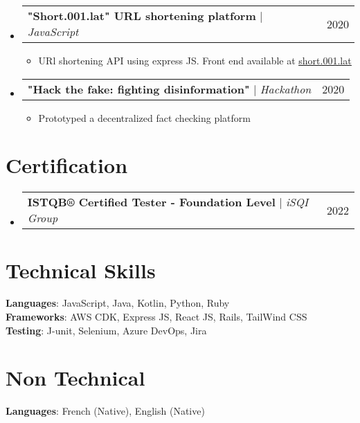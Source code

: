 \documentclass[letterpaper,11pt]{article}
\makeatletter
\newcommand{\resumeItem}[1]{
  \item\small{
    {#1 \vspace{-2pt}}
  }
}
\newcommand{\resumeProjectHeading}[2]{
    \item
    \begin{tabular*}{0.97\textwidth}{l@{\extracolsep{\fill}}r}
      \small#1 & #2 \\
    \end{tabular*}\vspace{-7pt}
}
\newcommand{\resumeSubHeadingListStart}{\begin{itemize}[leftmargin=0.15in, label={}]}
\newcommand{\resumeSubHeadingListEnd}{\end{itemize}}
\newcommand{\resumeItemListStart}{\begin{itemize}}
\newcommand{\resumeItemListEnd}{\end{itemize}\vspace{-5pt}}
\makeatother
\begin{document}
    \resumeSubHeadingListStart
    \resumeProjectHeading
          {\textbf{"Short.001.lat" URL shortening platform} $|$ \emph{JavaScript}}{2020}
          \resumeItemListStart
            \resumeItem{URl shortening API using express JS. Front end available at     \href{https://short.001.lat}{\underline{short.001.lat}}}
          \resumeItemListEnd
      \resumeProjectHeading
          {\textbf{"Hack the fake: fighting disinformation" } $|$ \emph{Hackathon}}{2020}
          \resumeItemListStart
            \resumeItem{Prototyped a decentralized fact checking platform}
          \resumeItemListEnd
          
    \resumeSubHeadingListEnd



%
\section{Certification}
 \begin{itemize}[leftmargin=0.15in, label={}]
 \resumeProjectHeading
          {\textbf{ISTQB® Certified Tester - Foundation Level} $|$ \emph{iSQI Group}}{2022}
 \end{itemize}
 
%
\section{Technical Skills}
 \begin{itemize}[leftmargin=0.15in, label={}]
    \small{\item{
     \textbf{Languages}{: JavaScript, Java, Kotlin, Python, Ruby} \\
     \textbf{Frameworks}{: AWS CDK, Express JS, React JS, Rails, TailWind CSS} \\
     \textbf{Testing}{: J-unit, Selenium, Azure DevOps, Jira}
    }}
 \end{itemize}
 
\section{Non Technical}
 \begin{itemize}[leftmargin=0.15in, label={}]
    \small{\item{
     \textbf{Languages}{: French (Native), English (Native)} \\
    }}
 \end{itemize}


\end{document}
